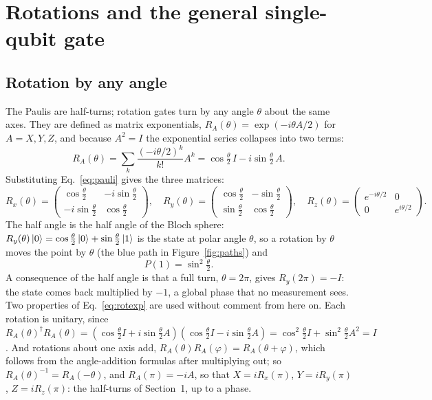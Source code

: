 \documentclass[11pt]{article}
\begin{document}
\section{Rotations and the general single-qubit gate}

\subsection{Rotation by any angle}

The Paulis are half-turns; rotation gates turn by any angle $\theta$ about the same axes. They are defined as matrix exponentials, $R_A(\theta) = \exp(-i\theta A/2)$ for $A = X, Y, Z$, and because $A^2 = I$ the exponential series collapses into two terms:
\begin{equation}
R_A(\theta) = \sum_k \frac{(-i\theta/2)^k}{k!}A^k = \cos\tfrac\theta2\,I - i\sin\tfrac\theta2\,A .
\label{eq:rotexp}
\end{equation}
Substituting Eq.~\eqref{eq:pauli} gives the three matrices:
\begin{equation}
R_x(\theta) = \begin{pmatrix}\cos\frac\theta2 & -i\sin\frac\theta2\\ -i\sin\frac\theta2 & \cos\frac\theta2\end{pmatrix},\quad
R_y(\theta) = \begin{pmatrix}\cos\frac\theta2 & -\sin\frac\theta2\\ \sin\frac\theta2 & \cos\frac\theta2\end{pmatrix},\quad
R_z(\theta) = \begin{pmatrix}e^{-i\theta/2} & 0\\ 0 & e^{i\theta/2}\end{pmatrix}.
\label{eq:rot}
\end{equation}
The half angle is the half angle of the Bloch sphere: $R_y(\theta)\ket{0} = \cos\frac\theta2\ket{0} + \sin\frac\theta2\ket{1}$ is the state at polar angle $\theta$, so a rotation by $\theta$ moves the point by $\theta$ (the blue path in Figure~\ref{fig:paths}) and
\begin{equation}
P(1) = \sin^2\tfrac\theta2 .
\label{eq:p1}
\end{equation}
A consequence of the half angle is that a full turn, $\theta = 2\pi$, gives $R_y(2\pi) = -I$: the state comes back multiplied by $-1$, a global phase that no measurement sees. Two properties of Eq.~\eqref{eq:rotexp} are used without comment from here on. Each rotation is unitary, since $R_A(\theta)^\dagger R_A(\theta) = (\cos\frac\theta2 I + i\sin\frac\theta2 A)(\cos\frac\theta2 I - i\sin\frac\theta2 A) = \cos^2\frac\theta2 I + \sin^2\frac\theta2 A^2 = I$. And rotations about one axis add, $R_A(\theta)R_A(\varphi) = R_A(\theta + \varphi)$, which follows from the angle-addition formulas after multiplying out; so $R_A(\theta)^{-1} = R_A(-\theta)$, and $R_A(\pi) = -iA$, so that $X = iR_x(\pi)$, $Y = iR_y(\pi)$, $Z = iR_z(\pi)$: the half-turns of Section~1, up to a phase.
\end{document}
